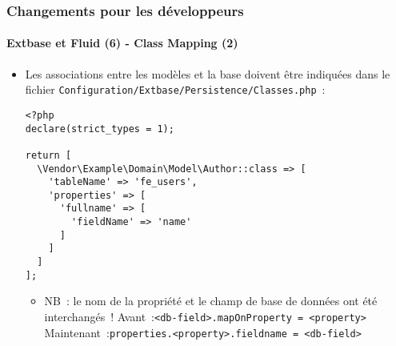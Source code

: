 
\begin{frame}[fragile]
	\frametitle{Changements pour les développeurs}
	\framesubtitle{Extbase et Fluid (6) - Class Mapping (2)}

	\lstset{basicstyle=\tiny\ttfamily}

	\begin{itemize}
		\item Les associations entre les modèles et la base doivent être indiquées dans le fichier
			\texttt{Configuration/Extbase/Persistence/Classes.php}~:

\begin{lstlisting}
<?php
declare(strict_types = 1);

return [
  \Vendor\Example\Domain\Model\Author::class => [
    'tableName' => 'fe_users',
    'properties' => [
      'fullname' => [
        'fieldName' => 'name'
      ]
    ]
  ]
];
\end{lstlisting}

		\begin{itemize}\smaller
			\item[\ding{228}] NB~: le nom de la propriété et le champ de base de données ont été interchangés~!\newline
				Avant~:\tabto{1.6cm}\texttt{<db-field>.mapOnProperty = <property>}\newline
				Maintenant~:\tabto{1.6cm}\texttt{properties.<property>.fieldname = <db-field>}
		\end{itemize}\normalsize

	\end{itemize}

\end{frame}


